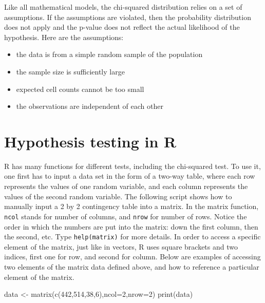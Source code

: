 \documentclass[
  letterpaper,
  DIV=11,
  numbers=noendperiod]{scrreprt}
\newenvironment{Shaded}{\begin{snugshade}}{\end{snugshade}}
\newcommand{\AttributeTok}[1]{\textcolor[rgb]{0.40,0.45,0.13}{#1}}
\newcommand{\DecValTok}[1]{\textcolor[rgb]{0.68,0.00,0.00}{#1}}
\newcommand{\FunctionTok}[1]{\textcolor[rgb]{0.28,0.35,0.67}{#1}}
\newcommand{\NormalTok}[1]{\textcolor[rgb]{0.00,0.23,0.31}{#1}}
\newcommand{\OtherTok}[1]{\textcolor[rgb]{0.00,0.23,0.31}{#1}}
\providecommand{\tightlist}{%
  \setlength{\itemsep}{0pt}\setlength{\parskip}{0pt}}\usepackage{longtable,booktabs,array}
\begin{document}
Like all mathematical models, the chi-squared distribution relies on a
set of assumptions. If the assumptions are violated, then the
probability distribution does not apply and the p-value does not reflect
the actual likelihood of the hypothesis. Here are the assumptions:

\begin{itemize}
\tightlist
\item
  the data is from a simple random sample of the population
\item
  the sample size is sufficiently large
\item
  expected cell counts cannot be too small
\item
  the observations are independent of each other
\end{itemize}

\hypertarget{hypothesis-testing-in-r}{%
\section{Hypothesis testing in R}\label{hypothesis-testing-in-r}}

\label{sec:comp6}

R has many functions for different tests, including the chi-squared
test. To use it, one first has to input a data set in the form of a
two-way table, where each row represents the values of one random
variable, and each column represents the values of the second random
variable. The following script shows how to manually input a 2 by 2
contingency table into a matrix. In the matrix function, \texttt{ncol}
stands for number of columns, and \texttt{nrow} for number of rows.
Notice the order in which the numbers are put into the matrix: down the
first column, then the second, etc. Type \texttt{help(matrix)} for more
details. In order to access a specific element of the matrix, just like
in vectors, R uses square brackets and two indices, first one for row,
and second for column. Below are examples of accessing two elements of
the matrix data defined above, and how to reference a particular element
of the matrix.

\begin{Shaded}
\begin{Highlighting}[]
\NormalTok{data }\OtherTok{\textless{}{-}} \FunctionTok{matrix}\NormalTok{(}\FunctionTok{c}\NormalTok{(}\DecValTok{442}\NormalTok{,}\DecValTok{514}\NormalTok{,}\DecValTok{38}\NormalTok{,}\DecValTok{6}\NormalTok{),}\AttributeTok{ncol=}\DecValTok{2}\NormalTok{,}\AttributeTok{nrow=}\DecValTok{2}\NormalTok{)}
\FunctionTok{print}\NormalTok{(data)}
\end{Highlighting}
\end{Shaded}
\end{document}
